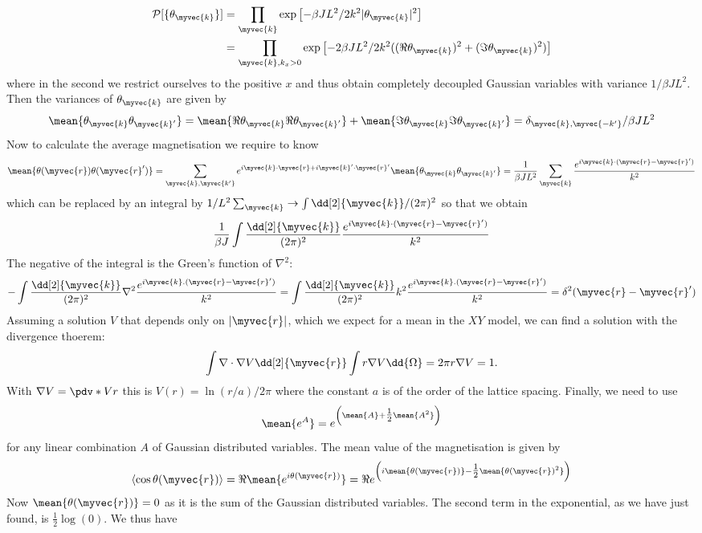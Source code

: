  \[
 \begin{split}
 \mathcal{P}[\{\theta_{\myvec{k}}\}] &= \prod_{\myvec{k}} \exp \left[-\beta J L^2/2 k^2 |\theta_{\myvec{k}}|^2 \right] \\ &=\prod_{\myvec{k}, k_x > 0} \exp \left[-2\beta J L^2/2 k^2((\Re \theta_{\myvec{k}})^2 + (\Im \theta_{\myvec{k}})^2) \right]
 \end{split}
 \]
 where in the second we restrict ourselves to the positive $x$ and thus obtain completely decoupled Gaussian variables with variance $1/\beta J L^2$. Then the variances of $\theta_{\myvec{k}}$ are given by 
 \[
 \mean{\theta_{\myvec{k}} \theta_{\myvec{k}'}} = \mean{\Re \theta_{\myvec{k}} \Re \theta_{\myvec{k}'}} + \mean{\Im \theta_{\myvec{k}} \Im \theta_{\myvec{k}'}} = \delta_{\myvec{k}, \myvec{-k'}}/\beta J L^2 
 \]
 Now to calculate the average magnetisation we require to know 
 \[
 \mean{\theta(\myvec{r})\theta(\myvec{r}')} = \sum_{\myvec{k}, \myvec{k'}} e^{i \myvec{k} \cdot \myvec{r} + i \myvec{k}' \cdot \myvec{r}'} \mean{\theta_{\myvec{k}} \theta_{\myvec{k}'}} = \frac{1}{\beta JL^2}\sum_{\myvec{k}} \frac{e^{i \myvec{k} \cdot( \myvec{r} - \myvec{r}')}}{k^2}
 \]
 which can be replaced by an integral by $1/L^2 \sum_{\myvec{k}} \to \int \dd[2]{\myvec{k}}/(2\pi)^2 $ so that we obtain
 \[
 \frac{1}{\beta J} \int \frac{\dd[2]{\myvec{k}}}{(2 \pi)^2} \frac{e^{i \myvec{k} \cdot( \myvec{r} - \myvec{r}')}}{k^2}
 \]
 The negative of the integral is the Green's function of $\nabla^2$:
 \[
 -\int  \frac{\dd[2]{\myvec{k}}}{(2 \pi)^2} \nabla^2 \frac{e^{i \myvec{k}.(\myvec{r} - \myvec{r}')}}{k^2} = \int  \frac{\dd[2]{\myvec{k}}}{(2 \pi)^2} k^2 \frac{e^{i \myvec{k}.(\myvec{r} - \myvec{r}')}}{k^2} = \delta^2(\myvec{r}-\myvec{r}')
 \]
 Assuming a solution $V$ that depends only on $|\myvec{r}|$, which we expect for a mean in the $XY$ model, we can find a solution with the divergence thoerem:
 \[
 \int \nabla \cdot \nabla V\dd[2]{\myvec{r}} \int r \nabla V \dd{\Omega} = 2 \pi r \nabla V  = 1. 
 \]
 With $\nabla V = \pdv*{V}{r}$  this is $V(r) = \ln(r/a)/2\pi$ where the constant $a$ is of the order of the lattice spacing. Finally, we need to use 
 \[
 \mean{e^{A}} = e^{\left(\mean{A} + \tfrac12 \mean{A^2}\right)}
 \]
 for any linear combination $A$ of Gaussian distributed variables. The mean value of the magnetisation is given by
 \[
 \left < \cos \theta( \myvec{r}) \right>  = \Re \mean{e^{i\theta(\myvec{r})}} = \Re e^{\left(i\mean{\theta(\myvec{r})} - \tfrac12 \mean{\theta(\myvec{r})^2}\right)}
 \]
 Now $\mean{\theta(\myvec{r})}=0$ as it is the sum of the Gaussian distributed variables. The second term in the exponential, as we have just found, is $\tfrac12 \log(0)$. We thus have
